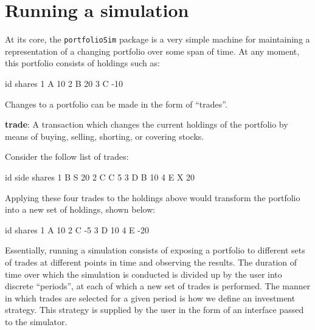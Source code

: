 \documentclass{article}
\begin{document}
\section{Running a simulation}

At its core, the \texttt{portfolioSim} package is a very simple
machine for maintaining a representation of a changing portfolio over
some span of time.  At any moment, this portfolio consists of holdings such as:

\begin{Schunk}
\begin{Soutput}
  id shares
1  A     10
2  B     20
3  C    -10
\end{Soutput}
\end{Schunk}

Changes to a portfolio can be made in the form of ``trades''.

\begin{description}

\item{\bf{trade}}: A transaction which changes the current holdings of
the portfolio by means of buying, selling, shorting, or covering
stocks.

\end{description}

Consider the follow list of trades:

\begin{Schunk}
\begin{Soutput}
  id side shares
1  B    S     20
2  C    C      5
3  D    B     10
4  E    X     20
\end{Soutput}
\end{Schunk}

Applying these four trades to the holdings above would transform the
portfolio into a new set of holdings, shown below:

\begin{Schunk}
\begin{Soutput}
  id shares
1  A     10
2  C     -5
3  D     10
4  E    -20
\end{Soutput}
\end{Schunk}

Essentially, running a simulation consists of exposing a portfolio to
different sets of trades at different points in time and observing the
results.  The duration of time over which the simulation is conducted
is divided up by the user into discrete ``periods'', at each of which
a new set of trades is performed.  The manner in which trades are
selected for a given period is how we define an investment strategy.
This strategy is supplied by the user in the form of an interface
passed to the simulator.
\end{document}
